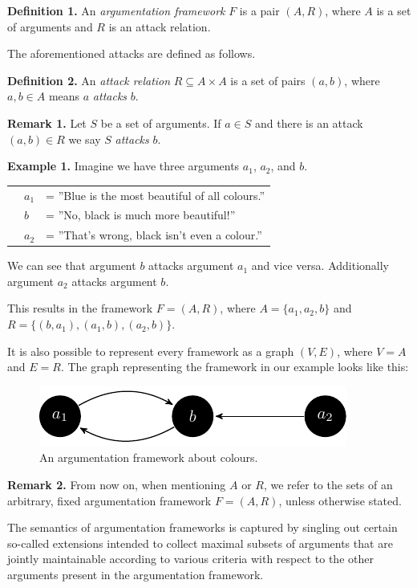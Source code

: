 \documentclass[draft,final]{vutinfth} %
\newcommand{\hl}{\par\vspace{6pt}} %
\newcommand{\cl}{\par\vspace{12pt}} %
\begin{document}
\textbf{Definition 1.} An \emph{argumentation framework} $F$ is a pair $(A,R)$, where $A$ is a set of arguments and $R$ is an attack relation.\cl

The aforementioned attacks are defined as follows.\hl

\textbf{Definition 2.} An \emph{attack relation} $R\subseteq A\times A$ is a set of pairs $(a,b)$, where $a,b\in A$ means $a$ \emph{attacks} $b$.\cl

\textbf{Remark 1.} Let $S$ be a set of arguments. If $a\in S$ and there is an attack $(a,b)\in R$ we say $S$ \emph{attacks} $b$.\cl

\textbf{Example 1.} Imagine we have three arguments $a_1$, $a_2$, and $b$.\hl
			\begin{tabular}{p{0.5cm}p{0.5cm}l}
			& $a_1$ & = ''Blue is the most beautiful of all colours.''\\
			& $b$ & = ''No, black is much more beautiful!''\\
			& $a_2$ & = ''That's wrong, black isn't even a colour.''
			\end{tabular}\hl
We can see that argument $b$ attacks argument $a_1$ and vice versa. Additionally argument $a_2$ attacks argument $b$.\hl
This results in the framework $F=(A,R)$, where $A=\{a_1,a_2,b\}$ and $R=\{(b,a_1),(a_1,b),(a_2,b)\}$.\cl

It is also possible to represent every framework as a graph $(V,E)$, where $V=A$ and $E=R$. The graph representing the framework in our example looks like this:

\FloatBarrier
	\begin{figure}[!ht]
		\centering
		\includegraphics[width=\linewidth]{graphs/ex1_v2.pdf}
		\caption{An argumentation framework about colours.}
	\end{figure}
\FloatBarrier

\textbf{Remark 2.} From now on, when mentioning $A$ or $R$, we refer to the sets of an arbitrary, fixed argumentation framework $F=(A,R)$, unless otherwise stated.\cl

The semantics of argumentation frameworks is captured by singling out certain so-called extensions intended to collect maximal subsets of arguments that are jointly maintainable according to various criteria with respect to the other arguments present in the argumentation framework.\cl
\end{document}
